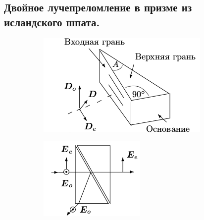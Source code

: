 \begin{enumerate}
\subsection*{Двойное лучепреломление в призме из исландского шпата.}
    \begin{figure}[h!]
    \centering
    \begin{subfigure}[b]{0.25\textwidth}
        \includegraphics[width=\textwidth]{013.png}
    \end{subfigure}
    \begin{subfigure}[b]{0.25\textwidth}
        \includegraphics[width=\textwidth]{017.png}
    \end{subfigure}
    \caption{}
    \end{figure}

\end{enumerate}
